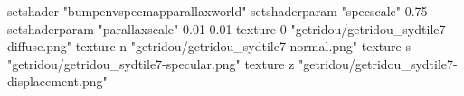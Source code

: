 setshader "bumpenvspecmapparallaxworld"
setshaderparam "specscale" 0.75
setshaderparam "parallaxscale" 0.01 0.01
texture 0 "getridou/getridou_sydtile7-diffuse.png"
texture n "getridou/getridou_sydtile7-normal.png"
texture s "getridou/getridou_sydtile7-specular.png"
texture z "getridou/getridou_sydtile7-displacement.png"
